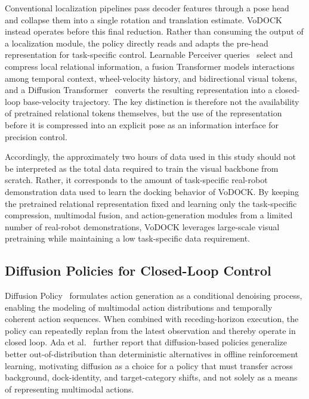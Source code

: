 \documentclass[letterpaper, 10 pt, conference]{IEEEtran}  %
\begin{document}
Conventional localization pipelines pass decoder features through a pose head and collapse them into a single rotation and translation estimate. VoDOCK instead operates before this final reduction. Rather than consuming the output of a localization module, the policy directly reads and adapts the pre-head representation for task-specific control. Learnable Perceiver queries~\cite{jaegle2021perceiver} select and compress local relational information, a fusion Transformer models interactions among temporal context, wheel-velocity history, and bidirectional visual tokens, and a Diffusion Transformer~\cite{peebles2023dit} converts the resulting representation into a closed-loop base-velocity trajectory. The key distinction is therefore not the availability of pretrained relational tokens themselves, but the use of the representation before it is compressed into an explicit pose as an information interface for precision control.

Accordingly, the approximately two hours of data used in this study should not be interpreted as the total data required to train the visual backbone from scratch. Rather, it corresponds to the amount of task-specific real-robot demonstration data used to learn the docking behavior of VoDOCK. By keeping the pretrained relational representation fixed and learning only the task-specific compression, multimodal fusion, and action-generation modules from a limited number of real-robot demonstrations, VoDOCK leverages large-scale visual pretraining while maintaining a low task-specific data requirement.

\subsection{Diffusion Policies for Closed-Loop Control}

Diffusion Policy~\cite{c3} formulates action generation as a conditional denoising process, enabling the modeling of multimodal action distributions and temporally coherent action sequences. When combined with receding-horizon execution, the policy can repeatedly replan from the latest observation and thereby operate in closed loop. Ada et al.~\cite{ada2024diffusionood} further report that diffusion-based policies generalize better out-of-distribution than deterministic alternatives in offline reinforcement learning, motivating diffusion as a choice for a policy that must transfer across background, dock-identity, and target-category shifts, and not solely as a means of representing multimodal actions.
\end{document}
